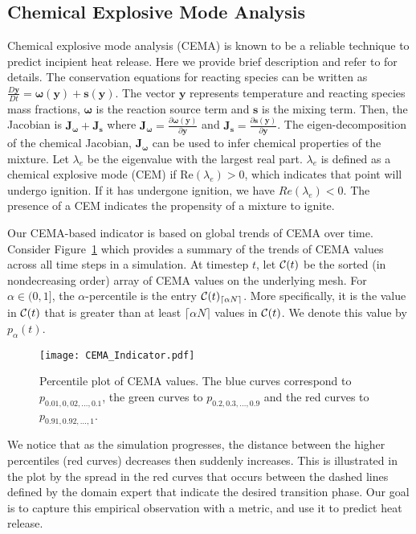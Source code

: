 \documentclass{sig-alternate}
\newcommand{\cC}{{\cal C}}
\newcommand{\cei}[1]{\lceil #1 \rceil}
\newcommand{\cema}{\cC}
\newcommand{\pt}{{p}}
\begin{document}
\subsection{Chemical Explosive Mode Analysis}
\label{sec:intution}
Chemical explosive mode analysis (CEMA) is known to be a reliable technique to predict incipient heat release. 
Here  we  provide brief description and refer to  \cite{lu,shan} for details. 
The conservation equations for reacting species can be written as $\frac{D\mathbf{y}}{Dt} = \mathbf{\omega(y)} + \mathbf{s(y)}$.
\noindent The vector $\mathbf{y}$ represents temperature and reacting
species mass fractions, $\mathbf{\omega}$ is the reaction source term and
$\mathbf{s}$ is the mixing term. Then, the Jacobian is  $\mathbf{J_\omega} +
\mathbf{J_s}$ where
$\mathbf{J_\omega} =  \frac{\partial \mathbf{\omega(y)}}{\partial \mathbf{y}}$ and
$\mathbf{J_s}  =  \frac{\partial \mathbf{s(y)}}{\partial \mathbf{y}}$. 
The eigen-decomposition of the chemical Jacobian, $\mathbf{J_\omega}$ can be used to infer
chemical properties of the mixture.  
 Let $\lambda_e$ be the eigenvalue with the largest real part. 
$\lambda_e$ is defined as a chemical explosive mode (CEM) if 
$\textrm{Re}(\lambda_e) > 0$, which indicates that point will undergo ignition. If it has undergone ignition, we
have $Re(\lambda_e)<0$.   The presence of a CEM indicates the propensity of a mixture to ignite.

Our CEMA-based indicator is based on global trends of CEMA over time.
Consider Figure~\ref{fig:CEMA_indicator} which provides a summary of the trends of CEMA
values across all time steps in a simulation. At timestep $t$, let $\cema(t)$ be
the sorted (in nondecreasing order) array of CEMA values on the underlying mesh. 
For $\alpha \in (0,1]$, the $\alpha$-percentile is the entry
$\cema(t)_{\lceil \alpha N \rceil}$. More specifically, it is the
value in $\cema(t)$ that is greater than at least $\cei{\alpha N}$
values in $\cema(t)$. We denote this value by $\pt_\alpha(t)$.

\begin{figure}[ht]
\centering
\texttt{[image: CEMA\_Indicator.pdf]}
\caption{\label{fig:CEMA_indicator} Percentile plot of CEMA values. 
The blue curves correspond to $p_{0.01, 0,02, \ldots , 0.1}$, the green curves to $p_{0.2, 0.3, \ldots ,0.9}$ and the red
curves to $p_{0.91, 0.92,  \ldots ,1}$. }
\end{figure}


We notice that as the simulation progresses, the distance between the higher
percentiles (red curves) decreases then suddenly increases. This is illustrated
in the plot by the spread in the red curves that occurs between the dashed
lines defined by the domain expert that indicate the desired transition phase.  Our goal is to capture this empirical observation with a metric,  and use it to predict  heat release.
 
\end{document}

